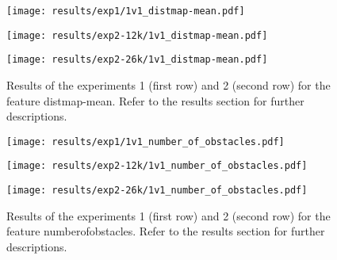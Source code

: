 \begin{figure}[h!]
    \centering
	\begin{minipage}{0.3\linewidth}
		\texttt{[image: results/exp1/1v1\_distmap-mean.pdf]}
	\end{minipage}

	\begin{minipage}{0.3\linewidth}
		\texttt{[image: results/exp2-12k/1v1\_distmap-mean.pdf]}
	\end{minipage}
	\begin{minipage}{0.3\linewidth}
		\texttt{[image: results/exp2-26k/1v1\_distmap-mean.pdf]}
	\end{minipage}

	\caption[ Results: Feature distmap-mean]{ Results of the experiments 1 (first row) and 2 (second row) for the feature distmap-mean. Refer to the results section for further descriptions. }
	\label{fig:appendix_distmap-mean}
\end{figure}
 \newpage 

 
\begin{figure}[h!]
    \centering
	\begin{minipage}{0.3\linewidth}
		\texttt{[image: results/exp1/1v1\_number\_of\_obstacles.pdf]}
	\end{minipage}

	\begin{minipage}{0.3\linewidth}
		\texttt{[image: results/exp2-12k/1v1\_number\_of\_obstacles.pdf]}
	\end{minipage}
	\begin{minipage}{0.3\linewidth}
		\texttt{[image: results/exp2-26k/1v1\_number\_of\_obstacles.pdf]}
	\end{minipage}

	\caption[ Results: Feature number\textunderscore of\textunderscore obstacles]{ Results of the experiments 1 (first row) and 2 (second row) for the feature number\textunderscore of\textunderscore obstacles. Refer to the results section for further descriptions. }
	\label{fig:appendix_number_of_obstacles}
\end{figure}
 
